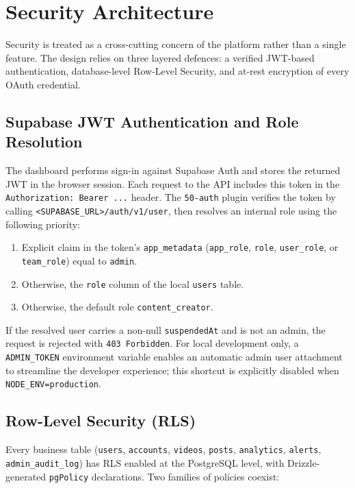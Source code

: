 \section{Security Architecture}

Security is treated as a cross-cutting concern of the platform rather than a single feature. The design relies on three layered defences: a verified JWT-based authentication, database-level Row-Level Security, and at-rest encryption of every OAuth credential.

\subsection{Supabase JWT Authentication and Role Resolution}

The dashboard performs sign-in against Supabase Auth and stores the returned JWT in the browser session. Each request to the API includes this token in the \texttt{Authorization: Bearer ...} header. The \texttt{50-auth} plugin verifies the token by calling \texttt{<SUPABASE\_URL>/auth/v1/user}, then resolves an internal role using the following priority:

\begin{enumerate}
    \item Explicit claim in the token's \texttt{app\_metadata} (\texttt{app\_role}, \texttt{role}, \texttt{user\_role}, or \texttt{team\_role}) equal to \texttt{admin}.
    \item Otherwise, the \texttt{role} column of the local \texttt{users} table.
    \item Otherwise, the default role \texttt{content\_creator}.
\end{enumerate}

If the resolved user carries a non-null \texttt{suspendedAt} and is not an admin, the request is rejected with \texttt{403 Forbidden}. For local development only, a \texttt{ADMIN\_TOKEN} environment variable enables an automatic admin user attachment to streamline the developer experience; this shortcut is explicitly disabled when \texttt{NODE\_ENV=production}.

\subsection{Row-Level Security (RLS)}

Every business table (\texttt{users}, \texttt{accounts}, \texttt{videos}, \texttt{posts}, \texttt{analytics}, \texttt{alerts}, \texttt{admin\_audit\_log}) has RLS enabled at the PostgreSQL level, with Drizzle-generated \texttt{pgPolicy} declarations. Two families of policies coexist:

